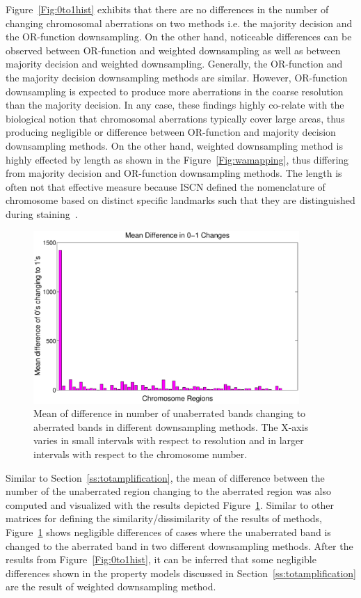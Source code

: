 Figure~\ref{Fig:0to1hist} exhibits that there are no differences in the number of changing chromosomal aberrations on two methods i.e. the majority decision and the OR-function downsampling. On the other hand, noticeable differences can be observed between OR-function and weighted downsampling as well as between majority decision and weighted downsampling. Generally, the OR-function and the majority decision downsampling methods are similar. However, OR-function downsampling is expected to produce more aberrations in the coarse resolution than the majority decision. In any case, these findings highly co-relate with the biological notion that chromosomal aberrations typically cover large areas, thus producing negligible or difference between OR-function and majority decision downsampling methods. On the other hand, weighted downsampling method is highly effected by length as shown in the Figure~\ref{Fig:wamapping}, thus differing from majority decision and OR-function downsampling methods. The length is often not that effective measure because ISCN defined the nomenclature of chromosome based on distinct specific landmarks such that they are distinguished during staining~\cite{iscn}.


\begin{figure}[h!]
\centering
\includegraphics[width=0.9\textwidth]{figures/mean01changes1}
\caption[Differences in \mbox{0-1} Changes]{Mean of difference in number of unaberrated bands changing to aberrated bands in different downsampling methods. The X-axis varies in small intervals with respect to resolution and in larger intervals with respect to the chromosome number.} \label{Fig:0to1diff}
\end{figure}

Similar to Section~\ref{ss:totamplification}, the mean of difference between the number of the unaberrated region changing to the aberrated region was also computed and visualized with the results depicted Figure~\ref{Fig:0to1diff}. Similar to other matrices for defining the similarity/dissimilarity of the results of methods, Figure~\ref{Fig:0to1diff} shows negligible differences of cases where the unaberrated band is changed to the aberrated band in two different downsampling methods. After the results from Figure~\ref{Fig:0to1hist}, it can be inferred that some negligible differences shown in the property models discussed in Section~\ref{ss:totamplification} are the result of weighted downsampling method.

